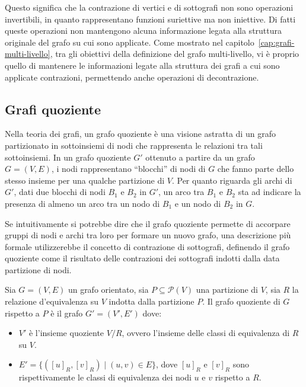 Questo significa che la contrazione di vertici e di sottografi non sono operazioni invertibili, in quanto
rappresentano funzioni suriettive ma non iniettive.
Di fatti queste operazioni non mantengono alcuna informazione legata alla struttura originale del grafo su cui
sono applicate.
Come mostrato nel capitolo~\ref{cap:grafi-multi-livello}, tra gli obiettivi della definizione del grafo multi-livello,
vi \`e proprio quello di mantenere le informazioni legate alla struttura dei grafi a cui sono applicate contrazioni,
permettendo anche operazioni di decontrazione.

\subsection{Grafi quoziente}\label{subsec:grafi-quoziente}

Nella teoria dei grafi, un grafo quoziente \`e una visione astratta di un grafo partizionato in sottoinsiemi di nodi
che rappresenta le relazioni tra tali sottoinsiemi.
In un grafo quoziente $G'$ ottenuto a partire da un grafo $G = (V, E)$, i nodi rappresentano ``blocchi'' di nodi di $G$
che fanno parte dello stesso insieme per una qualche partizione di $V$.
Per quanto riguarda gli archi di $G'$, dati due blocchi di nodi $B_1$ e $B_2$ in $G'$, un arco tra $B_1$ e $B_2$ sta
ad indicare la presenza di almeno un arco tra un nodo di $B_1$ e un nodo di $B_2$ in $G$.

Se intuitivamente si potrebbe dire che il grafo quoziente permette di accorpare gruppi di nodi e archi tra loro
per formare un nuovo grafo, una descrizione pi\`u formale utilizzerebbe il concetto di contrazione di sottografi,
definendo il grafo quoziente come il risultato delle contrazioni dei sottografi indotti dalla data partizione di nodi.

\begin{definition}
Sia $G = (V, E)$ un grafo orientato, sia $P \subseteq \mathcal{P}(V)$ una partizione di $V$, sia $R$ la relazione
d'equivalenza su $V$ indotta dalla partizione $P$.
Il grafo quoziente di $G$ rispetto a $P$ \`e il grafo $G' = (V', E')$ dove:
    \begin{itemize}
        \item $V'$ \`e l'insieme quoziente $V/R$, ovvero l'insieme delle classi di equivalenza di $R$ su $V$.
        \item $E' = \{([u]_R, [v]_R) \mid (u, v) \in E\}$, dove $[u]_R$ e $[v]_R$ sono rispettivamente le classi di
        equivalenza dei nodi $u$ e $v$ rispetto a $R$.
    \end{itemize}
\end{definition}


